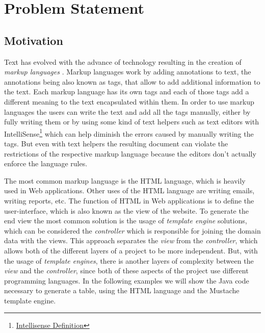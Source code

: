 \chapter{Problem Statement}
\label{cha:problemstatement}

\section{Motivation}

Text has evolved with the advance of technology resulting in the creation of \textit{markup languages} \cite{markuplanguages}. Markup languages work by adding annotations to text, the annotations being also known as tags, that allow to add additional information to the text. Each markup language has its own tags and each of those tags add a different meaning to the text encapsulated within them. In order to use markup languages the users can write the text and add all the tags manually, either by fully writing them or by using some kind of text helpers such as text editors with IntelliSense\footnote{\href{https://www.techopedia.com/definition/24580/intellisense}{Intellisense Definition}} which can help diminish the errors caused by manually writing the tags. But even with text helpers the resulting document can violate the restrictions of the respective markup language because the editors don't actually enforce the language rules. 

\noindent
The most common markup language is the \ac{HTML} language, which is heavily used in Web applications. Other uses of the \ac{HTML} language are writing emails, writing reports, etc. The function of \ac{HTML} in Web applications is to define the user-interface, which is also known as the view of the website. To generate the end view the most common solution is the usage of \textit{template engine}  solutions, which can be considered the \textit{controller} which is responsible for joining the domain data with the views. This approach separates the \textit{view} from the \textit{controller}, which allows both of the different layers of a project to be more independent. But, with the usage of \textit{template engines}, there is another layers of complexity between the \textit{view} and the \textit{controller}, since both of these aspects of the project use different programming languages. In the following examples we will show the Java code necessary to generate a table, using the \ac{HTML} language and the Mustache template engine.




























